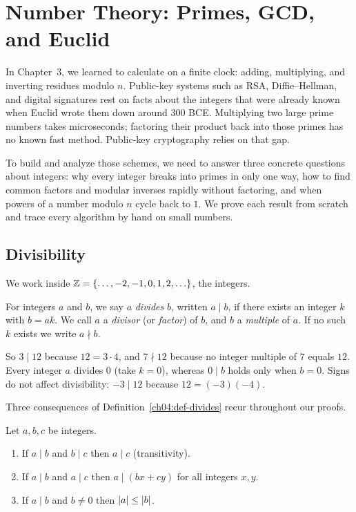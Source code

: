 \chapter{Number Theory: Primes, GCD, and Euclid}

In Chapter~3, we learned to calculate on a finite clock: adding, multiplying, and inverting residues modulo $n$. Public-key systems such as RSA, Diffie--Hellman, and digital signatures rest on facts about the integers that were already known when Euclid wrote them down around 300 BCE. Multiplying two large prime numbers takes microseconds; factoring their product back into those primes has no known fast method. Public-key cryptography relies on that gap.

To build and analyze those schemes, we need to answer three concrete questions about integers: why every integer breaks into primes in only one way, how to find common factors and modular inverses rapidly without factoring, and when powers of a number modulo $n$ cycle back to $1$. We prove each result from scratch and trace every algorithm by hand on small numbers.

\chapterline

\section{Divisibility}
\label{ch04:divisibility}

We work inside $\Z = \set{\dots, -2, -1, 0, 1, 2, \dots}$, the integers.

\begin{definition}[Divisibility]
\label{ch04:def-divides}
For integers $a$ and $b$, we say $a$ \emph{divides} $b$, written $a \mid b$, if there exists an
integer $k$ with $b = ak$. We call $a$ a \emph{divisor} (or \emph{factor}) of $b$, and $b$ a
\emph{multiple} of $a$. If no such $k$ exists we write $a \nmid b$.
\end{definition}

So $3 \mid 12$ because $12 = 3 \cdot 4$, and $7 \nmid 12$ because no integer multiple of $7$ equals
$12$. Every integer $a$ divides $0$ (take $k = 0$), whereas $0 \mid b$ holds only when $b = 0$.
Signs do not affect divisibility: $-3 \mid 12$ because $12 = (-3)(-4)$.

Three consequences of Definition~\ref{ch04:def-divides} recur throughout our proofs.

\begin{proposition}
\label{ch04:prop-div-rules}
Let $a, b, c$ be integers.
\begin{enumerate}
\item If $a \mid b$ and $b \mid c$ then $a \mid c$ (transitivity).
\item If $a \mid b$ and $a \mid c$ then $a \mid (bx + cy)$ for all integers $x, y$.
\item If $a \mid b$ and $b \neq 0$ then $\lvert a\rvert \le \lvert b\rvert$.
\end{enumerate}
\end{proposition}

